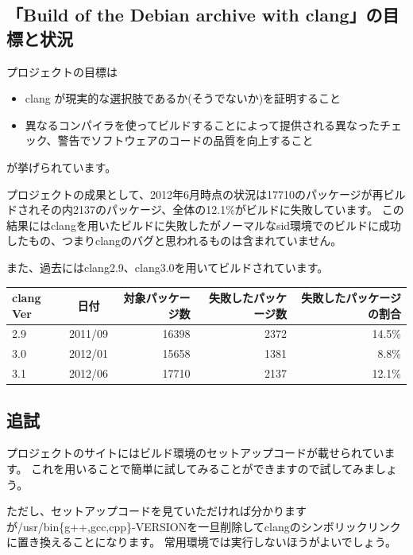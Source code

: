 \documentclass[mingoth,a4paper]{jsarticle}
\begin{document}
\subsection{「Build of the Debian archive with clang」の目標と状況}

プロジェクトの目標は

\begin{itemize}
\item clang が現実的な選択肢であるか(そうでないか)を証明すること
\item 異なるコンパイラを使ってビルドすることによって提供される異なったチェック、警告でソフトウェアのコードの品質を向上すること
\end{itemize}

が挙げられています。

\clearpage

プロジェクトの成果として、2012年6月時点の状況は17710のパッケージが再ビルドされその内2137のパッケージ、全体の12.1\%がビルドに失敗しています。
この結果にはclangを用いたビルドに失敗したがノーマルなsid環境でのビルドに成功したもの、つまりclangのバグと思われるものは含まれていません。

また、過去にはclang2.9、clang3.0を用いてビルドされています。

\begin{table}[h]
  \begin{tabular}{|l|c|r|r|r|} \hline
    clang Ver & 日付 & 対象パッケージ数 & 失敗したパッケージ数 & 失敗したパッケージの割合\\
    \hline \hline
    2.9 & 2011/09 & 16398 & 2372 & 14.5\% \\
    3.0 & 2012/01 & 15658 & 1381 & 8.8\% \\
    3.1 & 2012/06 & 17710 & 2137 & 12.1\% \\
    \hline
  \end{tabular}
\end{table}


\subsection{追試}

プロジェクトのサイトにはビルド環境のセットアップコードが載せられています。
これを用いることで簡単に試してみることができますので試してみましょう。

ただし、セットアップコードを見ていただければ分かりますが/usr/bin\{g++,gcc,cpp\}-VERSIONを一旦削除してclangのシンボリックリンクに置き換えることになります。
常用環境では実行しないほうがよいでしょう。
\\
\end{document}

